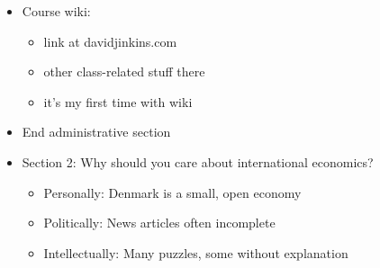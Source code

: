 \documentclass[ignorenonframetext,]{beamer}
\begin{document}
\begin{frame}

\begin{itemize}
\itemsep1pt\parskip0pt
\item
  Course wiki:

  \begin{itemize}
  \itemsep1pt\parskip0pt
  \item
    link at davidjinkins.com
  \item
    other class-related stuff there
  \item
    it's my first time with wiki
  \end{itemize}
\end{itemize}

\end{frame}


\begin{frame}

\begin{itemize}
\itemsep1pt\parskip0pt
\item
    End administrative section
\end{itemize}

\end{frame}


\begin{frame}

    \begin{itemize}
    \itemsep1pt\parskip0pt
        \item
        Section 2: Why should you care about international economics?
        \begin{itemize}
        \itemsep1pt\parskip0pt
            \item Personally: Denmark is a small, open economy
            \item Politically: News articles often incomplete
            \item Intellectually: Many puzzles, some without explanation
        \end{itemize}
    \end{itemize}

\end{frame}
\end{document}
